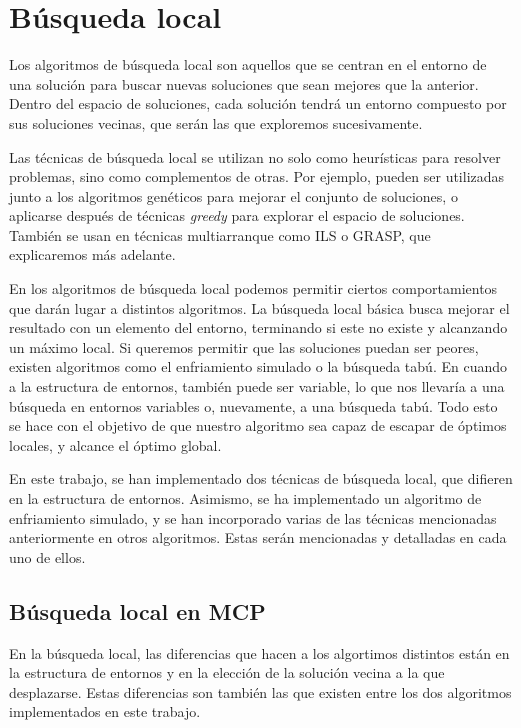 \section{Búsqueda local}

Los algoritmos de búsqueda local son aquellos que se centran en el entorno de una solución
para buscar nuevas soluciones que sean mejores que la anterior. Dentro del espacio de soluciones,
cada solución tendrá un entorno compuesto por sus soluciones vecinas, que serán las que exploremos
sucesivamente.

Las técnicas de búsqueda local se utilizan no solo como heurísticas para resolver problemas,
sino como complementos de otras. Por ejemplo, pueden ser utilizadas junto a los algoritmos genéticos
para mejorar el conjunto de soluciones, o aplicarse después de técnicas \textit{greedy} para explorar
el espacio de soluciones. También se usan en técnicas multiarranque como ILS o GRASP, que explicaremos
más adelante.

En los algoritmos de búsqueda local podemos permitir ciertos comportamientos que darán lugar a
distintos algoritmos. La búsqueda local básica busca mejorar el resultado con un elemento del
entorno, terminando si este no existe y alcanzando un máximo local. Si queremos permitir que
las soluciones puedan ser peores, existen algoritmos como el enfriamiento simulado o la búsqueda
tabú. En cuando a la estructura de entornos, también puede ser variable, lo que nos llevaría
a una búsqueda en entornos variables o, nuevamente, a una búsqueda tabú. Todo esto se hace con
el objetivo de que nuestro algoritmo sea capaz de escapar de óptimos locales, y alcance el
óptimo global.

En este trabajo, se han implementado dos técnicas de búsqueda local, que difieren en la estructura de
entornos. Asimismo, se ha implementado un algoritmo de enfriamiento simulado, y se han incorporado
varias de las técnicas mencionadas anteriormente en otros algoritmos. Estas serán mencionadas y
detalladas en cada uno de ellos.

\subsection{Búsqueda local en MCP}

En la búsqueda local, las diferencias que hacen a los algortimos distintos están en la estructura
de entornos y en la elección de la solución vecina a la que desplazarse. Estas diferencias son también
las que existen entre los dos algoritmos implementados en este trabajo.

